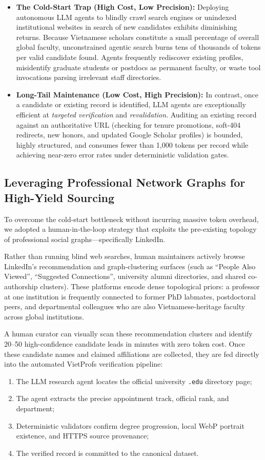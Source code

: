 \documentclass[11pt]{article}
\newcommand{\code}[1]{\texttt{\small #1}}
\begin{document}
\begin{itemize}
\item \textbf{The Cold-Start Trap (High Cost, Low Precision):} Deploying autonomous LLM agents to blindly crawl search engines or unindexed institutional websites in search of new candidates exhibits diminishing returns. Because Vietnamese scholars constitute a small percentage of overall global faculty, unconstrained agentic search burns tens of thousands of tokens per valid candidate found. Agents frequently rediscover existing profiles, misidentify graduate students or postdocs as permanent faculty, or waste tool invocations parsing irrelevant staff directories.
\item \textbf{Long-Tail Maintenance (Low Cost, High Precision):} In contrast, once a candidate or existing record is identified, LLM agents are exceptionally efficient at \emph{targeted verification} and \emph{revalidation}. Auditing an existing record against an authoritative URL (checking for tenure promotions, soft-404 redirects, new honors, and updated Google Scholar profiles) is bounded, highly structured, and consumes fewer than 1,000 tokens per record while achieving near-zero error rates under deterministic validation gates.
\end{itemize}

\subsection{Leveraging Professional Network Graphs for High-Yield Sourcing}
\label{sec:linkedin}
To overcome the cold-start bottleneck without incurring massive token overhead, we adopted a human-in-the-loop strategy that exploits the pre-existing topology of professional social graphs---specifically LinkedIn.

Rather than running blind web searches, human maintainers actively browse LinkedIn's recommendation and graph-clustering surfaces (such as ``People Also Viewed'', ``Suggested Connections'', university alumni directories, and shared co-authorship clusters). These platforms encode dense topological priors: a professor at one institution is frequently connected to former PhD labmates, postdoctoral peers, and departmental colleagues who are also Vietnamese-heritage faculty across global institutions.

A human curator can visually scan these recommendation clusters and identify 20--50 high-confidence candidate leads in minutes with zero token cost. Once these candidate names and claimed affiliations are collected, they are fed directly into the automated VietProfs verification pipeline:
\begin{enumerate}
\item The LLM research agent locates the official university \code{.edu} directory page;
\item The agent extracts the precise appointment track, official rank, and department;
\item Deterministic validators confirm degree progression, local WebP portrait existence, and HTTPS source provenance;
\item The verified record is committed to the canonical dataset.
\end{enumerate}
\end{document}
